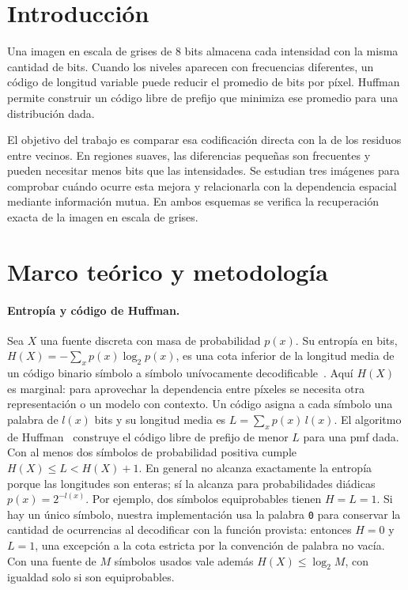 \documentclass[11pt,a4paper]{article}
\begin{document}
\section{Introducción}
Una imagen en escala de grises de 8 bits almacena cada intensidad con la misma cantidad de bits.
Cuando los niveles aparecen con frecuencias diferentes, un código de longitud variable puede reducir
el promedio de bits por píxel. Huffman permite construir un código libre de prefijo que minimiza ese
promedio para una distribución dada.

El objetivo del trabajo es comparar esa codificación directa con la de los residuos entre vecinos.
En regiones suaves, las diferencias pequeñas son frecuentes y pueden necesitar menos bits que las
intensidades. Se estudian tres imágenes para comprobar cuándo ocurre esta mejora y relacionarla con
la dependencia espacial mediante información mutua. En ambos esquemas se verifica la recuperación
exacta de la imagen en escala de grises.

\section{Marco teórico y metodología}
\paragraph{Entropía y código de Huffman.}
Sea $X$ una fuente discreta con masa de probabilidad $p(x)$. Su entropía en bits,
$H(X) = -\sum_x p(x)\log_2 p(x)$, es una cota inferior de la longitud media de un código binario
símbolo a símbolo unívocamente decodificable~\cite{shannon,cover}. Aquí $H(X)$ es marginal: para
aprovechar la dependencia entre píxeles se necesita otra representación o un modelo con contexto. Un código asigna a cada símbolo una palabra de $l(x)$ bits y su
longitud media es $L = \sum_x p(x)\,l(x)$. El algoritmo de Huffman~\cite{huffman} construye el
código libre de prefijo de menor $L$ para una pmf dada. Con al menos dos símbolos de probabilidad
positiva cumple $H(X) \le L < H(X) + 1$. En general no alcanza exactamente la entropía porque las
longitudes son enteras; sí la alcanza para probabilidades diádicas $p(x)=2^{-l(x)}$. Por ejemplo,
dos símbolos equiprobables tienen $H=L=1$. Si hay un único símbolo, nuestra implementación usa la
palabra \texttt{0} para conservar la cantidad de ocurrencias al decodificar con la función provista:
entonces $H=0$ y $L=1$, una excepción a la cota estricta por la convención de palabra no vacía.
Con una fuente de $M$ símbolos usados vale además $H(X)\le\log_2 M$, con igualdad
solo si son equiprobables.
\end{document}
